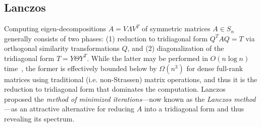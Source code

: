 \documentclass[10pt]{article}
\numberwithin{equation}{section}
\newcommand{\+}{%
	\raisebox{0.18ex}{\scaleobj{0.55}{+}}
}
\DeclareMathOperator*{\argmin}{arg\,min}
\theoremstyle{definition}
\theoremstyle{definition}
\begin{document}
\subsection*{Lanczos}
Computing eigen-decompositions $A = V \Lambda V^T$ of symmetric matrices $A \in S_n$ generally consists of two phases: (1) reduction to tridiagonal form $Q^T A Q = T$ via orthogonal similarity transformations $Q$, and (2) diagonalization of the tridiagonal form $T = Y \Theta Y^T$. 
While the latter may be performed in $O(n \log n)$ time~\cite{gu1995divide}, the former is effectively bounded below by $\Omega(n^3)$ for dense full-rank matrices using traditional (i.e. non-Strassen) matrix operations, and thus it is the reduction to tridiagonal form that dominates the computation. 
Lanczos~\cite{lanczos1950iteration} proposed the \emph{method of minimized iterations}---now known as the \emph{Lanczos method}---as an attractive alternative for reducing $A$ into a tridiagonal form and thus revealing its spectrum. 
 
\end{document}
